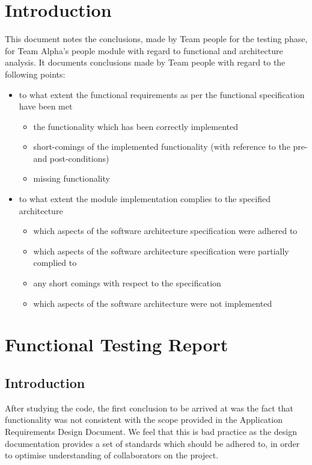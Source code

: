 \documentclass{article}
\begin{document}
 
\tableofcontents
\thispagestyle{empty}
\cleardoublepage


\setcounter{page}{1}
\section{Introduction}
This document notes the conclusions, made by Team people for the testing phase, for Team Alpha's people module with regard to functional and architecture analysis. It documents conclusions made by Team people with regard to the following points:

\begin{itemize}
    \item to what extent the functional requirements as per the functional specification have been met
        \begin{itemize}
            \item the functionality which has been correctly implemented
            \item short-comings of the implemented functionality (with     reference to the pre- and post-conditions)
            \item missing functionality
        \end{itemize}
        
    \item to what extent the module implementation complies to the specified architecture
        \begin{itemize}
            \item which aspects of the software architecture specification were adhered to
            \item which aspects of the software architecture specification were partially complied to 
            \item any short comings with respect to the specification
            \item which aspects of the software architecture were not implemented
        \end{itemize}
\end{itemize}

\section{Functional Testing Report}
	\subsection{Introduction}
	After studying the code, the first conclusion to be arrived at was the fact that functionality was not consistent with the scope provided in the Application Requirements Design Document. We feel that this is bad practice as the design documentation provides a set of standards which should be adhered to, in order to optimise understanding of collaborators on the project.
\end{document}
